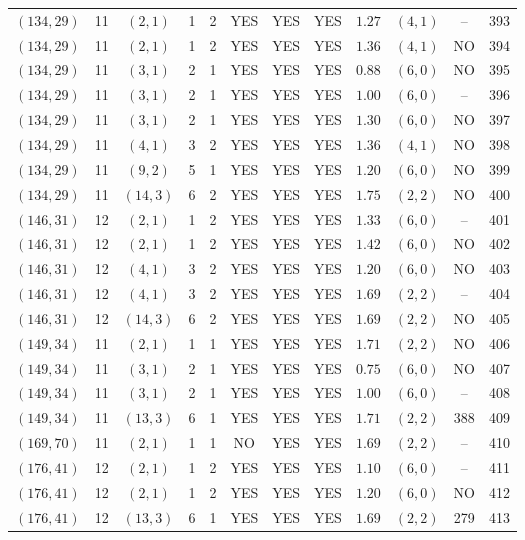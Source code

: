 \begin{longtable}{|c|c|c|c|c|c|c|c|c|c|c|c|}
$(134,29)$ & 11 & $(2,1)$ & 1 & 2 & YES & YES & YES & $1.27$ & $(4,1)$ & -- & 393\\
$(134,29)$ & 11 & $(2,1)$ & 1 & 2 & YES & YES & YES & $1.36$ & $(4,1)$ & NO & 394\\
$(134,29)$ & 11 & $(3,1)$ & 2 & 1 & YES & YES & YES & $0.88$ & $(6,0)$ & NO & 395\\
$(134,29)$ & 11 & $(3,1)$ & 2 & 1 & YES & YES & YES & $1.00$ & $(6,0)$ & -- & 396\\
$(134,29)$ & 11 & $(3,1)$ & 2 & 1 & YES & YES & YES & $1.30$ & $(6,0)$ & NO & 397\\
$(134,29)$ & 11 & $(4,1)$ & 3 & 2 & YES & YES & YES & $1.36$ & $(4,1)$ & NO & 398\\
$(134,29)$ & 11 & $(9,2)$ & 5 & 1 & YES & YES & YES & $1.20$ & $(6,0)$ & NO & 399\\
$(134,29)$ & 11 & $(14,3)$ & 6 & 2 & YES & YES & YES & $1.75$ & $(2,2)$ & NO & 400\\
$(146,31)$ & 12 & $(2,1)$ & 1 & 2 & YES & YES & YES & $1.33$ & $(6,0)$ & -- & 401\\
$(146,31)$ & 12 & $(2,1)$ & 1 & 2 & YES & YES & YES & $1.42$ & $(6,0)$ & NO & 402\\
$(146,31)$ & 12 & $(4,1)$ & 3 & 2 & YES & YES & YES & $1.20$ & $(6,0)$ & NO & 403\\
$(146,31)$ & 12 & $(4,1)$ & 3 & 2 & YES & YES & YES & $1.69$ & $(2,2)$ & -- & 404\\
$(146,31)$ & 12 & $(14,3)$ & 6 & 2 & YES & YES & YES & $1.69$ & $(2,2)$ & NO & 405\\
$(149,34)$ & 11 & $(2,1)$ & 1 & 1 & YES & YES & YES & $1.71$ & $(2,2)$ & NO & 406\\
$(149,34)$ & 11 & $(3,1)$ & 2 & 1 & YES & YES & YES & $0.75$ & $(6,0)$ & NO & 407\\
$(149,34)$ & 11 & $(3,1)$ & 2 & 1 & YES & YES & YES & $1.00$ & $(6,0)$ & -- & 408\\
$(149,34)$ & 11 & $(13,3)$ & 6 & 1 & YES & YES & YES & $1.71$ & $(2,2)$ & 388 & 409\\
$(169,70)$ & 11 & $(2,1)$ & 1 & 1 & NO & YES & YES & $1.69$ & $(2,2)$ & -- & 410\\
$(176,41)$ & 12 & $(2,1)$ & 1 & 2 & YES & YES & YES & $1.10$ & $(6,0)$ & -- & 411\\
$(176,41)$ & 12 & $(2,1)$ & 1 & 2 & YES & YES & YES & $1.20$ & $(6,0)$ & NO & 412\\
$(176,41)$ & 12 & $(13,3)$ & 6 & 1 & YES & YES & YES & $1.69$ & $(2,2)$ & 279 & 413\\

\end{longtable}
